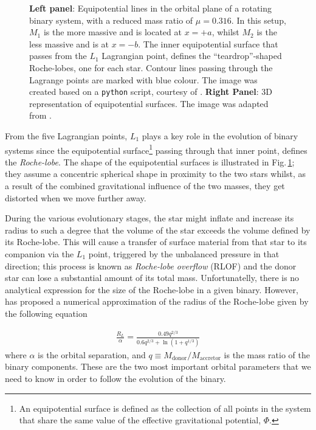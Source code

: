 \documentclass[../../main/thesis_msc.tex]{subfiles}
\begin{document}
\begin{figure}[h]
\begin{subfigure}[h]{0.535\textwidth}
   					 \end{subfigure}
   					 \caption{\textbf{Left panel}: Equipotential lines in the orbital plane of a rotating binary system, with a reduced mass ratio of $\mu = 0.316$. In this setup, $M_1$ is the more massive and is located at $x = +a$, whilst $M_2$ is the less massive and is at $x = -b$. The inner equipotential surface that passes from the $L_1$ Lagrangian point, defines the ``teardrop''-shaped Roche-lobes, one for each star. Contour lines passing through the Lagrange points are marked with blue colour. The image was created based on a \texttt{python} script, courtesy of \cite{Zingale}. \textbf{Right Panel}: 3D representation of equipotential surfaces. The image was adapted from \cite{Sluijs}.}
   					 \label{fig:eq_sur}
				\end{figure}
				
				From the five Lagrangian points, $L_1$ plays a key role in the evolution of binary systems since the equipotential surface\footnote{An equipotential surface is defined as the collection of all points in the system that share the same value of the effective gravitational potential, $\Phi$.} passing through that inner point, defines the \emph{Roche-lobe}. The shape of the equipotential surfaces is illustrated in Fig.\,\ref{fig:eq_sur}; they assume a concentric spherical shape in proximity to the two stars whilst, as a result of the combined gravitational influence of the two masses, they get distorted when we move further away.
				
				During the various evolutionary stages, the star might inflate and increase its radius to such a degree that the volume of the star exceeds the volume defined by its Roche-lobe. This will cause a transfer of surface material from that star to its companion via the $L_1$ point, triggered by the unbalanced pressure in that direction; this process is known as \emph{Roche-lobe overflow} (RLOF) and the donor star can lose a substantial amount of its total mass. Unfortunatelly, there is no analytical expression for the size of the Roche-lobe in a given binary. However, \cite{Eggleton1983} has proposed a numerical approximation of the radius of the Roche-lobe given by the following equation
				
				\begin{eqnarray}
					\label{eq:rl_radius}
					\frac{R_L}{\alpha} = \frac{0.49 q^{2/3}}{0.6 q^{2/3} + \ln(1 + q^{1/3})}
				\end{eqnarray}				 
				where $\alpha$ is the orbital separation, and $q \equiv M_{\text{donor}} / M_{\text{accretor}}$ is the mass ratio of the binary components. These are the two most important orbital parameters that we need to know in order to follow the evolution of the binary.
				
\end{document}
